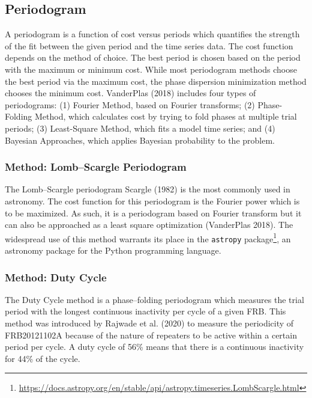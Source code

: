 \documentclass[
  rmp,
  amsmath,
  amssymb,
  preprint]{revtex4-2}
\begin{document}
\hypertarget{periodogram}{%
\subsection{Periodogram}\label{periodogram}}

A periodogram is a function of cost versus periods which quantifies the
strength of the fit between the given period and the time series data.
The cost function depends on the method of choice. The best period is
chosen based on the period with the maximum or minimum cost. While most
periodogram methods choose the best period via the maximum cost, the
phase dispersion minimization method chooses the minimum cost.
VanderPlas (2018) includes four types of periodograms: (1) Fourier
Method, based on Fourier transforms; (2) Phase-Folding Method, which
calculates cost by trying to fold phases at multiple trial periods; (3)
Least-Square Method, which fits a model time series; and (4) Bayesian
Approaches, which applies Bayesian probability to the problem.

\hypertarget{method-lombscargle-periodogram}{%
\subsubsection{Method: Lomb--Scargle
Periodogram}\label{method-lombscargle-periodogram}}

The Lomb--Scargle periodogram Scargle (1982) is the most commonly used
in astronomy. The cost function for this periodogram is the Fourier
power which is to be maximized. As such, it is a periodogram based on
Fourier transform but it can also be approached as a least square
optimization (VanderPlas 2018). The widespread use of this method
warrants its place in the \texttt{astropy} package\footnote{\url{https://docs.astropy.org/en/stable/api/astropy.timeseries.LombScargle.html}},
an astronomy package for the Python programming language.

\hypertarget{method-duty-cycle}{%
\subsubsection{Method: Duty Cycle}\label{method-duty-cycle}}

The Duty Cycle method is a phase--folding periodogram which measures the
trial period with the longest continuous inactivity per cycle of a given
FRB. This method was introduced by Rajwade et al. (2020) to measure the
periodicity of FRB20121102A because of the nature of repeaters to be
active within a certain period per cycle. A duty cycle of 56\% means
that there is a continuous inactivity for 44\% of the cycle.
\end{document}
